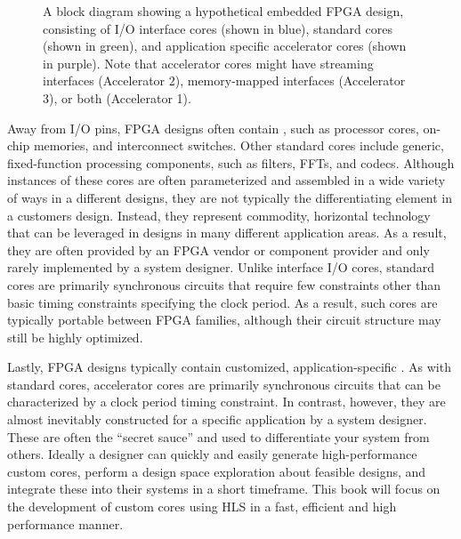 \begin{figure}
\centering
\def\svgwidth{\columnwidth}

\caption{A block diagram showing a hypothetical embedded FPGA design, consisting of I/O interface cores (shown in blue), standard cores (shown in green), and application specific accelerator cores (shown in purple).  Note that accelerator cores might have streaming interfaces (Accelerator 2), memory-mapped interfaces (Accelerator 3), or both (Accelerator 1). }
\label{fig:designTemplate}
\end{figure}

Away from I/O pins, FPGA designs often contain , such as processor cores, on-chip memories, and interconnect switches.   Other standard cores include generic, fixed-function processing components, such as filters, FFTs, and codecs.  Although instances of these cores are often parameterized and assembled in a wide variety of ways in a different designs, they are not typically the differentiating element in a customers design.  Instead, they represent commodity, horizontal technology that can be leveraged in designs in many different application areas.   As a result, they are often provided by an FPGA vendor or component provider and only rarely implemented by a system designer.  Unlike interface I/O cores, standard cores are primarily synchronous circuits that require few constraints other than basic timing constraints specifying the clock period.  As a result, such cores are typically portable between FPGA families, although their circuit structure may still be highly optimized.

Lastly, FPGA designs typically contain customized, application-specific .  As with standard cores, accelerator cores are primarily synchronous circuits that can be characterized by a clock period timing constraint.  In contrast, however, they are almost inevitably constructed for a specific application by a system designer.  These are often the ``secret sauce'' and used to differentiate your system from others. Ideally a designer can quickly and easily generate high-performance custom cores, perform a design space exploration about feasible designs, and integrate these into their systems in a short timeframe. This book will focus on the development of custom cores using HLS in a fast, efficient and high performance manner.

